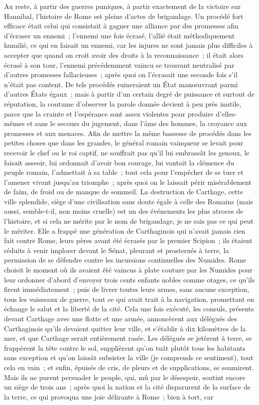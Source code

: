 \documentclass[french,twoside]{book} %
\begin{document}
Au reste, à partir des guerres puniques, à partir exactement de la victoire sur Hannibal, l'histoire de Rome est pleine d'actes de brigandage. Un procédé fort efficace était celui qui consistait à gagner une alliance par des promesses afin d'écraser un ennemi ; l'ennemi une fois écrasé, l'allié était méthodique­ment humilié, ce qui en faisait un ennemi, car les injures ne sont jamais plus difficiles à accepter que quand on croit avoir des droits à la reconnaissance ; il était alors écrasé à son tour, l'ennemi précédemment vaincu se trouvant neutralisé par d'autres promesses fallacieuses ; après quoi on l'écrasait une seconde fois s'il n'était pas content. De tels procédés ruineraient un État manœuvrant parmi d'autres États égaux ; mais à partir d'un certain degré de puissance et surtout de réputation, la coutume d'observer la parole donnée devient à peu près inutile, parce que la crainte et l'espérance sont assez violen­tes pour produire d'elles-mêmes et sans le secours du jugement, dans l'âme des hommes, la croyance aux promesses et aux menaces. Afin de mettre la même bassesse de procédés dans les petites choses que dans les grandes, le général romain vainqueur se levait pour recevoir le chef ou le roi captif, ne souffrait pas qu'il lui embrassât les genoux, le faisait asseoir, lui ordonnait d'avoir bon courage, lui vantait la clémence du peuple romain, l'admettait à sa table ; tout cela pour l'empêcher de se tuer et l'amener vivant jusqu'au triom­phe ; après quoi on le laissait périr misérablement de faim, de froid ou de manque de sommeil. La destruction de Carthage, cette ville splendide, siège d'une civili­sation sans doute égale à celle des Romains (mais aussi, semble-t-il, non moins cruelle) est un des événements les plus atroces de l'histoire, et si cela ne mérite par le nom de brigandage, je ne sais pas ce qui peut le mériter. Elle a frappé une génération de Carthaginois qui n'avait jamais rien fait contre Rome, leurs pères avant été écrasés par le premier Scipion ; ils étaient réduits à venir implorer devant le Sénat, pleurant et prosternés à terre, la permission de se défendre contre les incursions continuelles des Numides. Rome choisit le moment où ils avaient été vaincus à plate couture par les Numides pour leur ordonner d'abord d'envoyer trois cents enfants nobles comme otages, ce qu'ils firent immédiatement ; puis de livrer toutes leurs armes, sans aucune excep­tion, tous les vaisseaux de guerre, tout ce qui avait trait à la navigation, promettant en échange le salut et la liberté de la cité. Cela une fois exécuté, les consuls, présents devant Carthage avec une flotte et une armée, annoncèrent aux délégués des Carthaginois qu'ils devaient quitter leur ville, et s'établir à dix kilomètres de la mer, et que Carthage serait entièrement rasée. Les délé­gués se jetèrent à terre, se frappèrent la tête contre le sol, supplièrent qu'on tuât plutôt tous les habitants sans exception et qu'on laissât subsister la ville (je comprends ce sentiment), tout cela en vain ; et enfin, épuisés de cris, de pleurs et de supplications, se soumirent. Mais ils ne purent persuader le peuple, qui, mû par le désespoir, soutint encore un siège de trois ans ; après quoi la nation et la cité disparurent de la surface de la terre, ce qui provoqua une joie délirante à Rome ; bien à tort, car 
\end{document}
